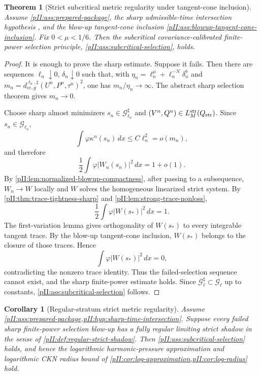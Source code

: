 \documentclass[11pt]{article}
\numberwithin{equation}{section}
\theoremstyle{plain}
\newtheorem{theorem}{Theorem}[section]
\newtheorem{corollary}{Corollary}[section]
\theoremstyle{definition}
\theoremstyle{remark}
\newcommand{\str}{\mathrm{str}}
\newcommand{\cc}{\mathrm{cc}}
\newcommand{\dx}{\,dx}
\begin{document}
\begin{theorem}[Strict subcritical metric regularity under tangent-cone inclusion]\label{pII:thm:conditional-strict-metric-regularity}
Assume \cref{pII:ass:prepared-package}, the sharp admissible-time intersection hypothesis , and the blow-up tangent-cone inclusion \cref{pII:ass:blowup-tangent-cone-inclusion}.  Fix $0<\mu<1/6$.  Then the subcritical covariance-calibrated finite-power selection principle, \cref{pII:ass:subcritical-selection}, holds.
\end{theorem}

\begin{proof}
It is enough to prove the sharp estimate.  Suppose it fails.  Then there are sequences $\ell_n\downarrow0$, $\delta_n\downarrow0$ such that, with $\eta_n=\ell_n^\mu+\ell_n^{-N}\delta_n^b$ and $m_n=d^{\ell_n,\sharp}_{\cc,g}(U^n,P^n,\tau^n)^2$, one has $m_n/\eta_n\to\infty$.  The abstract sharp selection theorem gives $m_n\to0$.

Choose sharp almost minimizers $s_n\in\mathcal G^\sharp_{\ell_n}$ and $(V^n,Q^n)\in L_M^{\str}(Q_{\rm str})$.  Since $s_n\in\mathcal G_{\ell_n}$,
\[
        \int\varphi\kappa^n(s_n)\dx\le C\ell_n^2=o(m_n),
\]
and therefore
\[
        \frac12\int\varphi|W_n(s_n)|^2\dx=1+o(1).
\]
By \cref{pII:lem:normalized-blowup-compactness}, after passing to a subsequence, $W_n\to W$ locally and $W$ solves the homogeneous linearized strict system.  By \cref{pII:thm:trace-tightness-sharp} and \cref{pII:lem:strong-trace-nonloss},
\[
        \frac12\int\varphi|W(s_*)|^2\dx=1.
\]
The first-variation lemma gives orthogonality of $W(s_*)$ to every integrable tangent trace.  By the blow-up tangent-cone inclusion, $W(s_*)$ belongs to the closure of those traces.  Hence
\[
        \int\varphi|W(s_*)|^2\dx=0,
\]
contradicting the nonzero trace identity.  Thus the failed-selection sequence cannot exist, and the sharp finite-power estimate holds.  Since $\mathcal G_\ell^\sharp\subset\mathcal G_\ell$ up to constants, \cref{pII:ass:subcritical-selection} follows.
\end{proof}

\begin{corollary}[Regular-stratum strict metric regularity]\label{pII:cor:regular-stratum-metric}
Assume \cref{pII:ass:prepared-package,pII:hyp:sharp-time-intersection}.  Suppose every failed sharp finite-power selection blow-up has a fully regular limiting strict shadow in the sense of \cref{pII:def:regular-strict-shadow}.  Then \cref{pII:ass:subcritical-selection} holds, and hence the logarithmic harmonic-pressure approximation and logarithmic CKN radius bound of \cref{pII:cor:log-approximation,pII:cor:log-radius} hold.
\end{corollary}
\end{document}
